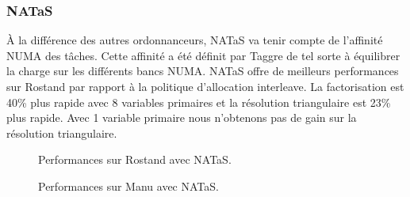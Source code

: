 \subsubsection{NATaS}
\`A la différence des autres ordonnanceurs, NATaS va tenir compte de l'affinité NUMA des tâches.
%
Cette affinité a été définit par Taggre de tel sorte à équilibrer la charge sur les différents bancs NUMA.
%
NATaS offre de meilleurs performances sur Rostand par rapport à la politique d'allocation interleave.
%
La factorisation est 40\% plus rapide avec 8 variables primaires et la résolution triangulaire est 23\% plus rapide.
%
Avec 1 variable primaire nous n'obtenons pas de gain sur la résolution triangulaire.


\begin{figure}[!ht]
     \begin{center}
    \end{center}
    \caption{Performances sur Rostand avec NATaS.}
\end{figure}



\begin{figure}[!ht]
     \begin{center}
    \end{center}
    \caption{Performances sur Manu avec NATaS.}
\end{figure}
